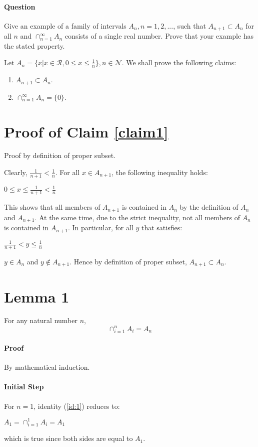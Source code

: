 \documentclass[14pt]{extarticle}
\begin{document}
	\paragraph{Question} Give an example of a family of intervals $A_n, n=1,2, ...$, such that $A_{n+1} \subset A_n$ for all $n$ and $\cap_{n=1}^\infty A_n$ consists of a single real number. Prove that your example has the stated property.
	\par\bigskip
	Let $A_n = \{x|x \in \mathcal{R}, 0 \le x \le \frac{1}{n}\}, n \in \mathcal{N}$.  We shall prove the following claims:
	\begin{enumerate}
		\item $A_{n+1} \subset A_n$.\label{claim1}
		\item $\cap_{n=1}^\infty A_n=\{0\}$.
	\end{enumerate}
	\section{Proof of Claim \ref{claim1}} Proof by definition of proper subset.
	\par\bigskip
	Clearly, $\frac{1}{n+1} < \frac{1}{n}$.  For all $x \in A_{n+1}$, the following inequality holds:
	\begin{center}
	$0 \le x \le \frac{1}{n+1} < \frac{1}{n}$
	\end{center}
	This shows that all members of $A_{n+1}$ is contained in $A_n$ by the definition of $A_n$ and $A_{n+1}$.  At the same time, due to the strict inequality, not all members of $A_n$ is contained in $A_{n+1}$.  In particular, for all $y$ that satisfies:
	\begin{center}
		$ \frac{1}{n+1} < y \le \frac{1}{n}$
	\end{center}
	$y \in A_n$ and $y \notin A_{n+1}$.	 Hence by definition of proper subset, $A_{n+1} \subset A_n$.
	\section{Lemma 1}
	For any natural number $n$,
	\begin{equation}\label{id:1}
	\cap_{i=1}^n A_i= A_n
	\end{equation}
	\paragraph{Proof} By mathematical induction.
	\paragraph{Initial Step} For $n=1$, identity (\ref{id:1}) reduces to:
	\begin{center}
		$A_1 = \cap_{i=1}^1 A_i= A_1$
	\end{center}	
	which is true since both sides are equal to $A_1$.
\end{document}
